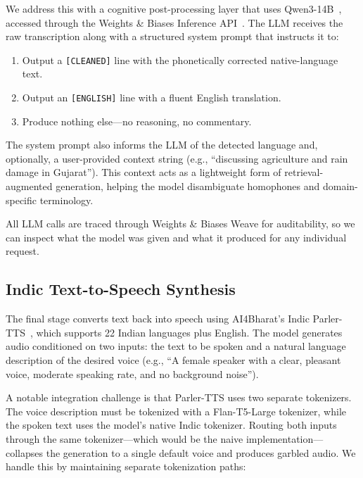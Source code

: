 We address this with a cognitive post-processing layer that uses Qwen3-14B~\cite{qwen3_2025}, accessed through the Weights \& Biases Inference API~\cite{wandb2024}. The LLM receives the raw transcription along with a structured system prompt that instructs it to:

\begin{enumerate}[leftmargin=*]
    \item Output a \texttt{[CLEANED]} line with the phonetically corrected native-language text.
    \item Output an \texttt{[ENGLISH]} line with a fluent English translation.
    \item Produce nothing else---no reasoning, no commentary.
\end{enumerate}

The system prompt also informs the LLM of the detected language and, optionally, a user-provided context string (e.g., ``discussing agriculture and rain damage in Gujarat''). This context acts as a lightweight form of retrieval-augmented generation, helping the model disambiguate homophones and domain-specific terminology.

All LLM calls are traced through Weights \& Biases Weave for auditability, so we can inspect what the model was given and what it produced for any individual request.

\subsection{Indic Text-to-Speech Synthesis}
\label{sec:tts}

The final stage converts text back into speech using AI4Bharat's Indic Parler-TTS~\cite{ai4bharat_indic_parler}, which supports 22 Indian languages plus English. The model generates audio conditioned on two inputs: the text to be spoken and a natural language description of the desired voice (e.g., ``A female speaker with a clear, pleasant voice, moderate speaking rate, and no background noise'').

A notable integration challenge is that Parler-TTS uses two separate tokenizers. The voice description must be tokenized with a Flan-T5-Large tokenizer, while the spoken text uses the model's native Indic tokenizer. Routing both inputs through the same tokenizer---which would be the naive implementation---collapses the generation to a single default voice and produces garbled audio. We handle this by maintaining separate tokenization paths:

